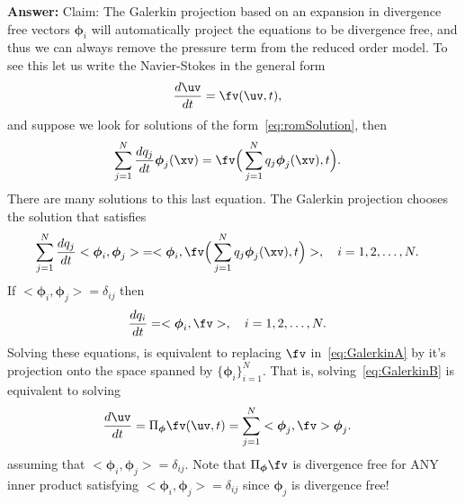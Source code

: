 \documentclass[11pt]{article}
\newcommand{\phiv}{\boldsymbol{\phi}}
\begin{document}
{\bf Answer:} Claim: The Galerkin projection based on an expansion in divergence free vectors $\phiv_i$
will automatically project the equations to be divergence free, and thus we can
always remove the pressure term from the reduced order model. To see this let us write the
Navier-Stokes in the general form
\begin{align}
   \frac{ d\uv}{dt} & = \fv(\uv,t) ,  \label{eq:GalerkinA}
\end{align}
and suppose we look for solutions of the form~\eqref{eq:romSolution}, then
\begin{align}
  \sum_{j=1}^N  \frac{ d q_j}{dt} \phiv_j(\xv)  & = \fv\Big(\sum_{j=1}^N  q_j \phiv_j(\xv),t\Big) .
\end{align}
There are many solutions to this last equation.
The Galerkin projection chooses the solution that satisfies 
\begin{align}
  \sum_{j=1}^N \frac{ d q_j}{dt} <\phiv_i,\phiv_j>  & = <\phiv_i, \fv\Big(\sum_{j=1}^N  q_j \phiv_j(\xv),t\Big) >, \quad i=1,2,\ldots,N.
\end{align}
If $<\phiv_i,\phiv_j>=\delta_{ij}$ then
\begin{align}
  \frac{ d q_i}{dt}  & = <\phiv_i, \fv>, \quad i=1,2,\ldots,N.  \label{eq:GalerkinB}
\end{align}
Solving these equations, is equivalent to replacing $\fv$ in~\eqref{eq:GalerkinA} by it's projection onto 
the space spanned by $\{ \phiv_i\}_{i=1}^N$. 
That is, solving~\eqref{eq:GalerkinB} is equivalent to solving 
\begin{align}
   \frac{ d\uv}{dt} & = \Pi_{\phiv} \fv(\uv,t) = \sum_{j=1}^N <\phiv_j, \fv> \phiv_j.  \label{eq:GalerkinC}
\end{align}
assuming that $<\phiv_i,\phiv_j>=\delta_{ij}$. 
Note that $\Pi_{\phiv} \fv$ is divergence free for ANY inner product satisfying $<\phiv_i,\phiv_j>=\delta_{ij}$
since $\phiv_j$ is divergence free!
\end{document}
